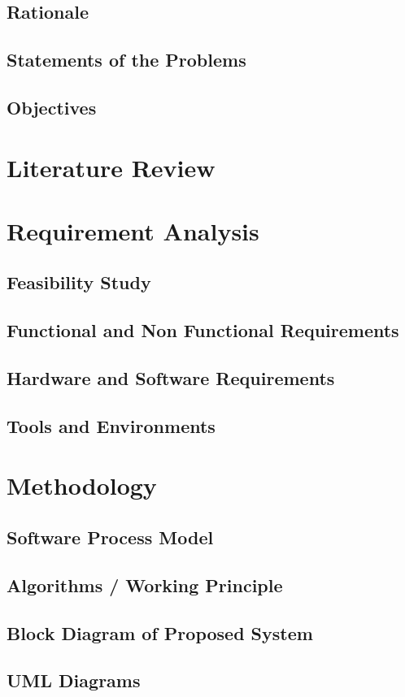 \documentclass[12pt,a4paper]{report}
\begin{document}
\section{Rationale}
\section{Statements of the Problems}
\section{Objectives}
\chapter{Literature Review}
\chapter{Requirement Analysis}
\section{Feasibility Study}
\section{Functional and Non Functional Requirements}
\section{Hardware and Software Requirements}
\section{Tools and Environments}
\chapter{Methodology}
\section{Software Process Model}
\section{Algorithms / Working Principle}
\section{Block Diagram of Proposed System}
\section{UML Diagrams}
\end{document}
